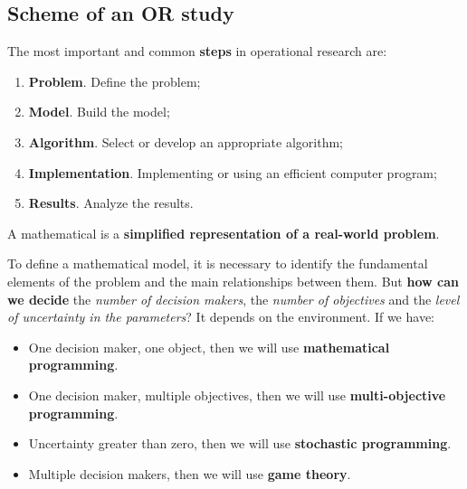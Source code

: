 \subsection{Scheme of an OR study}

The most important and common \textbf{steps} in operational research are:
\begin{enumerate}
    \item \textbf{Problem}. Define the problem;
    \item \textbf{Model}. Build the model;
    \item \textbf{Algorithm}. Select or develop an appropriate algorithm;
    \item \textbf{Implementation}. Implementing or using an efficient computer program;
    \item \textbf{Results}. Analyze the results.
\end{enumerate}

\begin{definitionbox}
    A mathematical  is a \textbf{simplified representation of a real-world problem}.
\end{definitionbox}

\noindent
To define a mathematical model, it is necessary to identify the fundamental elements of the problem and the main relationships between them. But \textbf{how can we decide} the \emph{number of decision makers}, the \emph{number of objectives} and the \emph{level of uncertainty in the parameters}? It depends on the environment. If we have:
\begin{itemize}
    \item One decision maker, one object, then we will use \textbf{mathematical programming}.
    \item One decision maker, multiple objectives, then we will use \textbf{multi-objective programming}.
    \item Uncertainty greater than zero, then we will use \textbf{stochastic programming}.
    \item Multiple decision makers, then we will use \textbf{game theory}.
\end{itemize}

